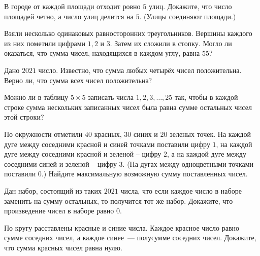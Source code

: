 \documentclass{article}
\begin{document}
\begin{enumerate_boxed}
        \item В городе от каждой площади отходит ровно $5$ улиц.
        Докажите, что число площадей четно, а число улиц делится на $5$.
        (Улицы соединяют площади.)

        \item Взяли несколько одинаковых равносторонних треугольников.
        Вершины каждого из них пометили цифрами $1, 2$ и $3$.
        Затем их сложили в стопку.
        Могло ли оказаться, что сумма чисел, находящихся в каждом углу, равна $55$?

        \item Дано $2021$ число.
        Известно, что сумма любых четырёх чисел положительна.
        Верно ли, что сумма всех чисел положительна?

        \item Можно ли в таблицу $5 \times 5$ записать числа $1, 2, 3,
        \dots, 25$ так, чтобы в каждой строке сумма нескольких
        записанных чисел была равна сумме остальных чисел
        этой строки?

        \item По окружности отметили $40$ красных, $30$ синих и $20$ зеленых точек.
        На каждой дуге между соседними красной и синей точками поставили цифру $1$, на каждой дуге между соседними красной и зеленой – цифру $2$, а на каждой дуге между соседними синей и зеленой – цифру $3$.
        (На дугах между одноцветными точками поставили $0$.) Найдите максимальную возможную сумму поставленных чисел.

        \item Дан набор, состоящий из таких $2021$ числа, что если каждое число в наборе заменить на сумму остальных, то получится тот же набор.
        Докажите, что произведение чисел в наборе равно $0$.

        \item По кругу расставлены красные и синие числа.
        Каждое красное число равно сумме соседних чисел, а каждое синее~--- полусумме соседних чисел.
        Докажите, что сумма красных чисел равна нулю.

    \end{enumerate_boxed}
\end{document}
